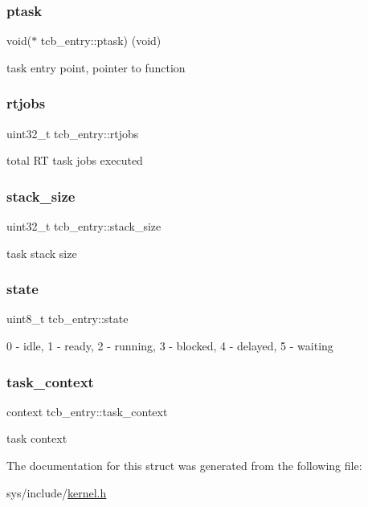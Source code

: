 \subsubsection{\texorpdfstring{ptask}{ptask}}
{\footnotesize\ttfamily void($\ast$ tcb\+\_\+entry\+::ptask) (void)}

task entry point, pointer to function \mbox{\label{structtcb__entry_a51802bc7ba3ee4cfcbcbfb404e606643}} 
\subsubsection{\texorpdfstring{rtjobs}{rtjobs}}
{\footnotesize\ttfamily uint32\+\_\+t tcb\+\_\+entry\+::rtjobs}

total RT task jobs executed \mbox{\label{structtcb__entry_a2174ff4c5cf178e9dc3d652c472b23dd}} 
\subsubsection{\texorpdfstring{stack\+\_\+size}{stack\_size}}
{\footnotesize\ttfamily uint32\+\_\+t tcb\+\_\+entry\+::stack\+\_\+size}

task stack size \mbox{\label{structtcb__entry_a67f430ab50cb8ff9133e133fc240f3d7}} 
\subsubsection{\texorpdfstring{state}{state}}
{\footnotesize\ttfamily uint8\+\_\+t tcb\+\_\+entry\+::state}

0 -\/ idle, 1 -\/ ready, 2 -\/ running, 3 -\/ blocked, 4 -\/ delayed, 5 -\/ waiting \mbox{\label{structtcb__entry_a589e6c94b17a97df5d22edf504acfd42}} 
\subsubsection{\texorpdfstring{task\+\_\+context}{task\_context}}
{\footnotesize\ttfamily context tcb\+\_\+entry\+::task\+\_\+context}

task context 

The documentation for this struct was generated from the following file\+:\begin{DoxyCompactItemize}
\item 
sys/include/\hyperlink{kernel_8h}{kernel.\+h}\end{DoxyCompactItemize}
